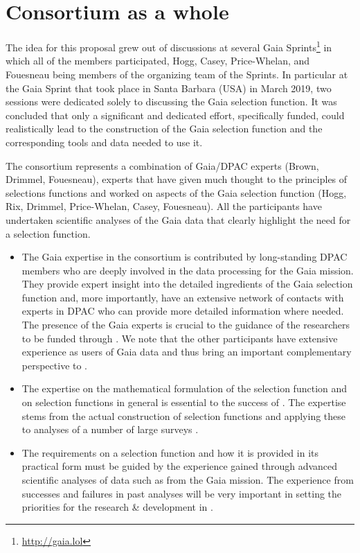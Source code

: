 \makerisklist

\section{Consortium as a whole}
\label{sec:consortium}

The idea for this proposal grew out of discussions at several Gaia Sprints\footnote{\url{http://gaia.lol}} in which all of the {\acro} members participated, Hogg, Casey, Price-Whelan, and Fouesneau being members of the organizing team of the Sprints. In particular at the Gaia Sprint that took place in Santa Barbara (USA) in March 2019, two sessions were dedicated solely to discussing the Gaia selection function. It was concluded that only a significant and dedicated effort, specifically funded, could realistically lead to the construction of the Gaia selection function and the corresponding tools and data needed to use it.

The consortium represents a combination of Gaia/DPAC experts (Brown, Drimmel, Fouesneau), experts that have given much thought to the principles of selections functions and worked on aspects of the Gaia selection function (Hogg, Rix, Drimmel, Price-Whelan, Casey, Fouesneau). All the participants have undertaken scientific analyses of the Gaia data that clearly highlight the need for a selection function. 
\begin{itemize}
    \item The Gaia expertise in the consortium is contributed by long-standing DPAC members who are deeply involved in the data processing for the Gaia mission. They provide expert insight into the detailed ingredients of the Gaia selection function and, more importantly, have an extensive network of contacts with experts in DPAC who can provide more detailed information where needed. The presence of the Gaia experts is crucial to the guidance of the researchers to be funded through {\acro}. We note that the other participants have extensive experience as users of Gaia data and thus bring an important complementary perspective to {\acro}.
    \item The expertise on the mathematical formulation of the selection function and on selection functions in general is essential to the success of {\acro}. The expertise stems from the actual construction of selection functions and applying these to analyses of a number of large surveys .
    \item The requirements on a selection function and how it is provided in its practical form must be guided by the experience gained through advanced scientific analyses of data such as from the Gaia mission. The experience from successes and failures in past analyses will be very important in setting the priorities for the research \& development in {\acro}.
\end{itemize}


